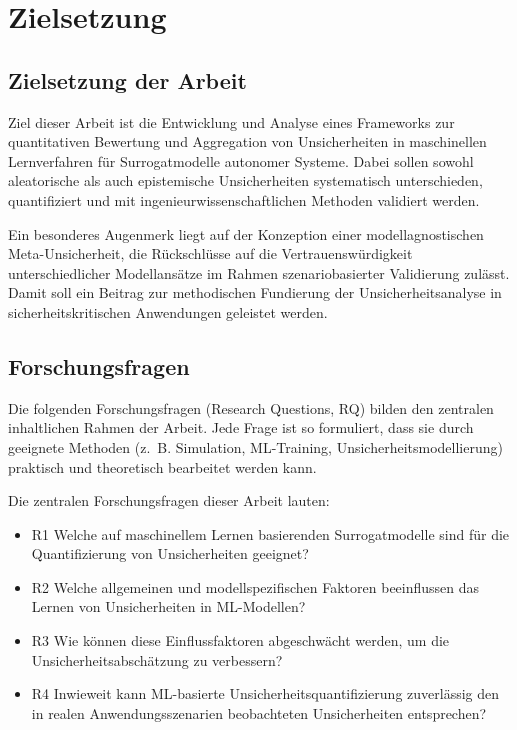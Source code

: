 
\chapter{Zielsetzung}
\label{chapter:zielsetzung}

\section{Zielsetzung der Arbeit}

Ziel dieser Arbeit ist die Entwicklung und Analyse eines Frameworks zur quantitativen Bewertung und Aggregation von Unsicherheiten in maschinellen Lernverfahren für Surrogatmodelle autonomer Systeme. Dabei sollen sowohl aleatorische als auch epistemische Unsicherheiten systematisch unterschieden, quantifiziert und mit ingenieurwissenschaftlichen Methoden validiert werden.

Ein besonderes Augenmerk liegt auf der Konzeption einer modellagnostischen Meta-Unsicherheit, die Rückschlüsse auf die Vertrauenswürdigkeit unterschiedlicher Modellansätze im Rahmen szenariobasierter Validierung zulässt. Damit soll ein Beitrag zur methodischen Fundierung der Unsicherheitsanalyse in sicherheitskritischen Anwendungen geleistet werden.

\section{Forschungsfragen}

Die folgenden Forschungsfragen (Research Questions, RQ) bilden den zentralen inhaltlichen Rahmen der Arbeit. Jede Frage ist so formuliert, dass sie durch geeignete Methoden (z.~B. Simulation, ML-Training, Unsicherheitsmodellierung) praktisch und theoretisch bearbeitet werden kann. 

Die zentralen Forschungsfragen dieser Arbeit lauten:

\begin{itemize}
  \item {R1} Welche auf maschinellem Lernen basierenden Surrogatmodelle sind für die Quantifizierung von Unsicherheiten geeignet?
  \item {R2} Welche allgemeinen und modellspezifischen Faktoren beeinflussen das Lernen von Unsicherheiten in ML-Modellen?
  \item {R3} Wie können diese Einflussfaktoren abgeschwächt werden, um die Unsicherheitsabschätzung zu verbessern?
  \item {R4} Inwieweit kann ML-basierte Unsicherheitsquantifizierung zuverlässig den in realen Anwendungsszenarien beobachteten Unsicherheiten entsprechen?
\end{itemize}

